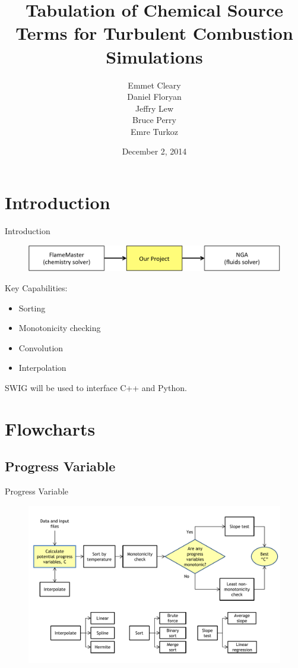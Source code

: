 \documentclass{beamer}
\title[APC 524 Design Review]{Tabulation of Chemical Source Terms for Turbulent Combustion Simulations}
\author{Emmet Cleary \\
Daniel Floryan \\
Jeffry Lew \\
Bruce Perry \\
Emre Turkoz}
\date{December 2, 2014}
\begin{document}
\begin{frame}
  \titlepage
\end{frame}


\section{Introduction}
\begin{frame}{Introduction}
\begin{figure}
\includegraphics[width=\textwidth]{scope.pdf}
\end{figure}
\vskip 5mm
Key Capabilities:
\begin{itemize}
\item Sorting
\item Monotonicity checking
\item Convolution
\item Interpolation
\end{itemize}
\vspace{12pt}
SWIG will be used to interface C++ and Python.

\end{frame}

\section{Flowcharts}

\subsection{Progress Variable}
\begin{frame}{Progress Variable}
\begin{figure}
\includegraphics[width=\textwidth]{diagram_1_shortened_v1.pdf}
\end{figure}
\end{frame}
\end{document}

